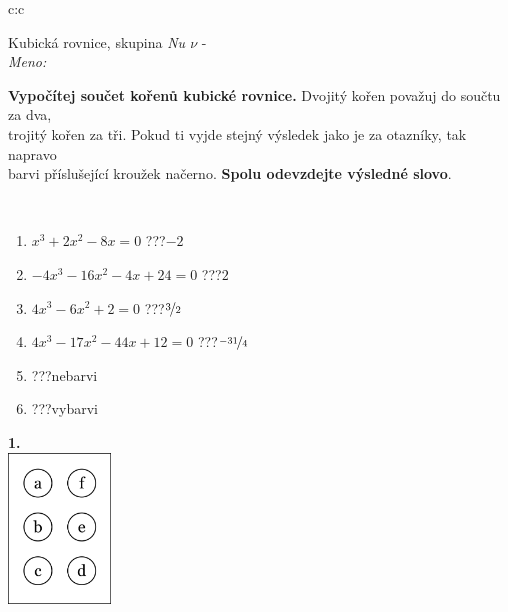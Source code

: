 \documentclass[10pt]{report}
\begin{document}
\begin{tabular}{c:c}
\begin{minipage}[c][104.5mm][t]{0.5\linewidth}
\begin{center}
\vspace{7mm}
{\huge Kubická rovnice, skupina \textit{Nu $\nu$} -}\\[5mm]
\textit{Meno:}\phantom{xxxxxxxxxxxxxxxxxxxxxxxxxxxxxxxxxxxxxxxxxxxxxxxxxxxxxxxxxxxxxxxxx}\\[5mm]
\begin{minipage}{0.95\linewidth}
\textbf{Vypočítej součet kořenů kubické rovnice.} Dvojitý kořen považuj do součtu za dva,\\trojitý kořen za tři. Pokud ti vyjde stejný výsledek jako je za otazníky, tak napravo\\barvi příslušející kroužek načerno. \textbf{Spolu odevzdejte výsledné slovo}.
\end{minipage}
\\[1mm]
\begin{minipage}{0.79\linewidth}
\begin{center}
\begin{varwidth}{\linewidth}
\begin{enumerate}
\Large
\item $x^3+2x^2-8x=0$\quad \dotfill\; ???\;\dotfill \quad $-2$
\item $-4x^3-16x^2-4x+24=0$\quad \dotfill\; ???\;\dotfill \quad $2$
\item $4x^3-6x^2+2=0$\quad \dotfill\; ???\;\dotfill \quad $\nicefrac{3}{2}$
\item $4x^3-17x^2-44x+12=0$\quad \dotfill\; ???\;\dotfill \quad $\nicefrac{-31}{4}$
\item \quad \dotfill\; ???\;\dotfill \quad nebarvi
\item \quad \dotfill\; ???\;\dotfill \quad vybarvi
\end{enumerate}
\end{varwidth}
\end{center}
\end{minipage}
\begin{minipage}{0.20\linewidth}
\begin{center}
{\Huge\bfseries 1.} \\[2mm]
\includegraphics[height=40mm]{../images/braille.png}

\end{center}
\end{minipage}
\end{center}
\end{minipage}
\end{tabular}
\end{document}
